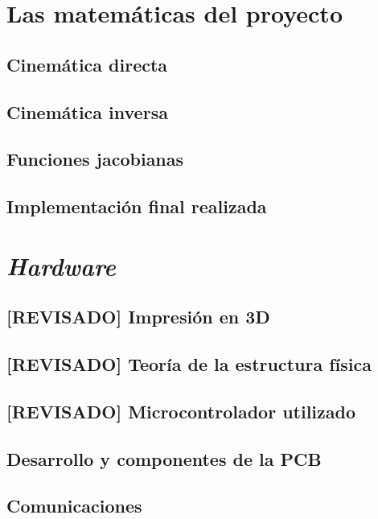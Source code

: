 \chapter{Las matemáticas del proyecto}
\label{chap:maths}

\section{Cinemática directa}

\section{Cinemática inversa}

\section{Funciones jacobianas}

\section{Implementación final realizada}


\chapter{\textit{Hardware}}
\label{chap:hardware}

\section{[REVISADO] Impresión en 3D}

\section{[REVISADO] Teoría de la estructura física}

\section{[REVISADO] Microcontrolador utilizado}

\section{Desarrollo y componentes de la PCB}

\section{Comunicaciones}

